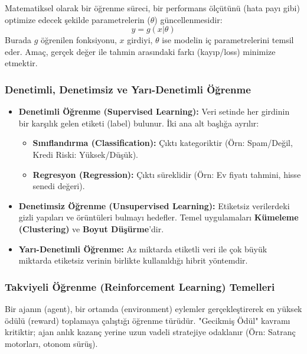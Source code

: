 \documentclass[12pt,a4paper]{article}
\begin{document}
Matematiksel olarak bir öğrenme süreci, bir performans ölçütünü (hata payı gibi) optimize edecek şekilde parametrelerin ($\theta$) güncellenmesidir:
\begin{equation}
    y = g(x | \theta)
\end{equation}
Burada $g$ öğrenilen fonksiyonu, $x$ girdiyi, $\theta$ ise modelin iç parametrelerini temsil eder. Amaç, gerçek değer ile tahmin arasındaki farkı (kayıp/loss) minimize etmektir.

\subsubsection{Denetimli, Denetimsiz ve Yarı-Denetimli Öğrenme}
\begin{itemize}
    \item \textbf{Denetimli Öğrenme (Supervised Learning):} Veri setinde her girdinin bir karşılık gelen etiketi (label) bulunur. İki ana alt başlığa ayrılır:
    \begin{itemize}
        \item \textbf{Sınıflandırma (Classification):} Çıktı kategoriktir (Örn: Spam/Değil, Kredi Riski: Yüksek/Düşük).
        \item \textbf{Regresyon (Regression):} Çıktı süreklidir (Örn: Ev fiyatı tahmini, hisse senedi değeri).
    \end{itemize}
    \item \textbf{Denetimsiz Öğrenme (Unsupervised Learning):} Etiketsiz verilerdeki gizli yapıları ve örüntüleri bulmayı hedefler. Temel uygulamaları \textbf{Kümeleme (Clustering)} ve \textbf{Boyut Düşürme}'dir.
    \item \textbf{Yarı-Denetimli Öğrenme:} Az miktarda etiketli veri ile çok büyük miktarda etiketsiz verinin birlikte kullanıldığı hibrit yöntemdir.
\end{itemize}

\subsubsection{Takviyeli Öğrenme (Reinforcement Learning) Temelleri}
Bir ajanın (agent), bir ortamda (environment) eylemler gerçekleştirerek en yüksek ödülü (reward) toplamaya çalıştığı öğrenme türüdür. "Gecikmiş Ödül" kavramı kritiktir; ajan anlık kazanç yerine uzun vadeli stratejiye odaklanır (Örn: Satranç motorları, otonom sürüş).
\end{document}

